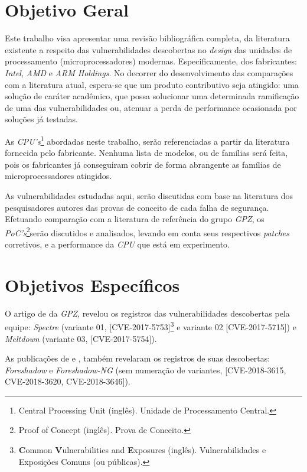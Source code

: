 \documentclass[
	12pt,				%
	openright,			%
	oneside,            %
	a4paper,			%
	chapter=TITLE,		%
	section=TITLE,		%
	subsection=TITLE,	%
	subsubsection=TITLE,%
	english,			%
	brazil,				%
]{abntex2}
\begin{document}
\section{Objetivo Geral}

Este trabalho visa apresentar uma revisão bibliográfica completa, da literatura existente a respeito das vulnerabilidades descobertas no \emph{design} das unidades de processamento (microprocessadores) modernas. Especificamente, dos fabricantes: \emph{Intel}, \emph{AMD} e \emph{ARM Holdings}. No decorrer do desenvolvimento das comparações com a literatura atual, espera-se que um produto contributivo seja atingido: uma solução de caráter acadêmico, que possa solucionar uma determinada ramificação de uma das vulnerabilidades ou, atenuar a perda de performance ocasionada por soluções já testadas.

As \emph{CPU's}\footnote{Central Processing Unit (inglês). Unidade de Processamento Central.} abordadas neste trabalho, serão referenciadas a partir da literatura fornecida pelo fabricante. Nenhuma lista de modelos, ou de famílias será feita, pois os fabricantes já conseguiram cobrir de forma abrangente as famílias de microprocessadores atingidos.

As vulnerabilidades estudadas aqui, serão discutidas com base na literatura dos pesquisadores autores das provas de conceito de cada falha de segurança. Efetuando comparação com a literatura de referência do grupo \emph{GPZ}, os \emph{PoC's}\footnote{Proof of Concept (inglês). Prova de Conceito.}serão discutidos e analisados, levando em conta seus respectivos \emph{patches} corretivos, e a performance da \emph{CPU} que está em experimento.

\section{Objetivos Específicos}

O artigo de  da \emph{GPZ}, revelou os registros das vulnerabilidades descobertas pela equipe: \emph{Spectre} (variante 01, [CVE-2017-5753]\footnote{\textbf{C}ommon \textbf{V}ulnerabilities and \textbf{E}xposures (inglês). Vulnerabilidades e Exposições Comuns (ou públicas).} e variante 02 [CVE-2017-5715]\footnotemark[\value{footnote}]) e \emph{Meltdown} (variante 03, [CVE-2017-5754]\footnotemark[\value{footnote}]).

As publicações de  e , também revelaram os registros de suas descobertas: \emph{Foreshadow} e \emph{Foreshadow-NG} (sem numeração de variantes, [CVE-2018-3615, CVE-2018-3620, CVE-2018-3646]\footnotemark[\value{footnote}]).
\end{document}
